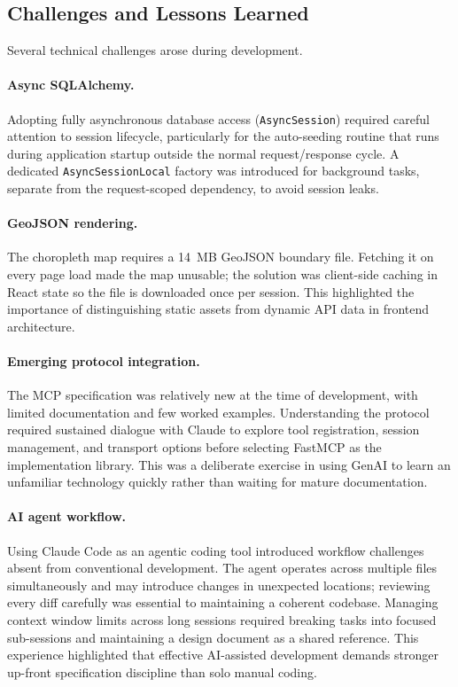 \subsection{Challenges and Lessons Learned}

Several technical challenges arose during development.

\paragraph{Async SQLAlchemy.}
Adopting fully asynchronous database access (\texttt{AsyncSession}) required
careful attention to session lifecycle, particularly for the auto-seeding routine
that runs during application startup outside the normal request/response cycle.
A dedicated \texttt{AsyncSessionLocal} factory was introduced for background
tasks, separate from the request-scoped dependency, to avoid session leaks.

\paragraph{GeoJSON rendering.}
The choropleth map requires a 14~MB GeoJSON boundary file.
Fetching it on every page load made the map unusable; the solution was
client-side caching in React state so the file is downloaded once per session.
This highlighted the importance of distinguishing static assets from dynamic
API data in frontend architecture.

\paragraph{Emerging protocol integration.}
The MCP specification was relatively new at the time of development, with limited
documentation and few worked examples.
Understanding the protocol required sustained dialogue with Claude to explore
tool registration, session management, and transport options before selecting
FastMCP as the implementation library.
This was a deliberate exercise in using GenAI to learn an unfamiliar technology
quickly rather than waiting for mature documentation.

\paragraph{AI agent workflow.}
Using Claude Code as an agentic coding tool introduced workflow challenges absent
from conventional development.
The agent operates across multiple files simultaneously and may introduce changes
in unexpected locations; reviewing every diff carefully was essential to maintaining
a coherent codebase.
Managing context window limits across long sessions required breaking tasks into
focused sub-sessions and maintaining a design document as a shared reference.
This experience highlighted that effective AI-assisted development demands stronger
up-front specification discipline than solo manual coding.

